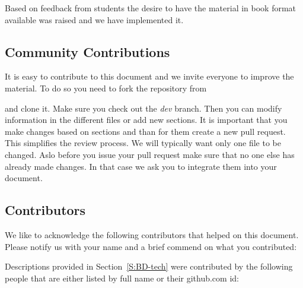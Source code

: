 
Based on feedback from students the desire to have the material in
book format available was raised and we have implemented it.


\subsection{Community Contributions}

It is easy to contribute to this document and we invite everyone to
improve the material. To do so you need to fork the repository from 


and clone it. Make sure you check out the \textit{dev} branch. Then you
can modify information in the different files or add new sections. It
is important that you make changes based on sections and than for them
create a new pull request. This simplifies the review process. We will
typically want only one file to be changed. Aslo before you issue your
pull request make sure that no one else has already made changes. In
that case we ask you to integrate them into your document.


\subsection{Contributors}

We like to acknowledge the following contributors that helped on this
document. Please notify us with your name and a brief commend on what
you contributed:

Descriptions provided in Section~\ref{S:BD-tech} were contributed by the
following people that are either listed by full name or their
github.com id:


